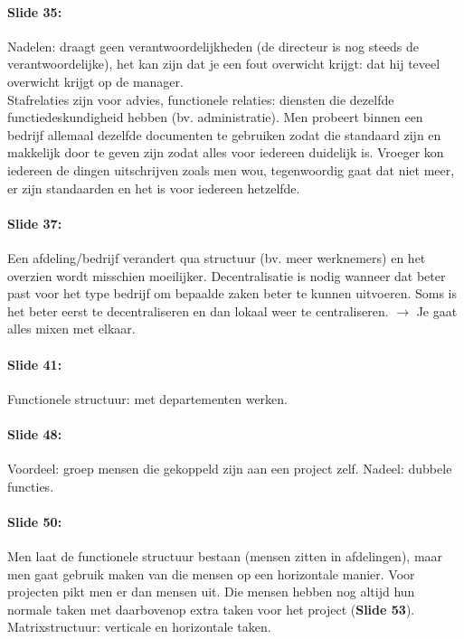 \documentclass[10pt,a4paper]{report}
\begin{document}
\paragraph{Slide 35:} Nadelen: draagt geen verantwoordelijkheden (de directeur is nog steeds de verantwoordelijke), het kan zijn dat je een fout overwicht krijgt: dat hij teveel overwicht krijgt op de manager.\\
Stafrelaties zijn voor advies, functionele relaties: diensten die dezelfde functiedeskundigheid hebben (bv. administratie). Men probeert binnen een bedrijf allemaal dezelfde documenten te gebruiken zodat die standaard zijn en makkelijk door te geven zijn zodat alles voor iedereen duidelijk is. Vroeger kon iedereen de dingen uitschrijven zoals men wou, tegenwoordig gaat dat niet meer, er zijn standaarden en het is voor iedereen hetzelfde.

\paragraph{Slide 37:} Een afdeling/bedrijf verandert qua structuur (bv. meer werknemers) en het overzien wordt misschien moeilijker. Decentralisatie is nodig wanneer dat beter past voor het type bedrijf om bepaalde zaken beter te kunnen uitvoeren. Soms is het beter eerst te decentraliseren en dan lokaal weer te centraliseren. $\rightarrow$ Je gaat alles mixen met elkaar.

\paragraph{Slide 41:} Functionele structuur: met departementen werken.

\paragraph{Slide 48:} Voordeel: groep mensen die gekoppeld zijn aan een project zelf. Nadeel: dubbele functies.

\paragraph{Slide 50:} Men laat de functionele structuur bestaan (mensen zitten in afdelingen), maar men gaat gebruik maken van die mensen op een horizontale manier. Voor projecten pikt men er dan mensen uit. Die mensen hebben nog altijd hun normale taken met daarbovenop extra taken voor het project (\textbf{Slide 53}). Matrixstructuur: verticale en horizontale taken.
\end{document}
